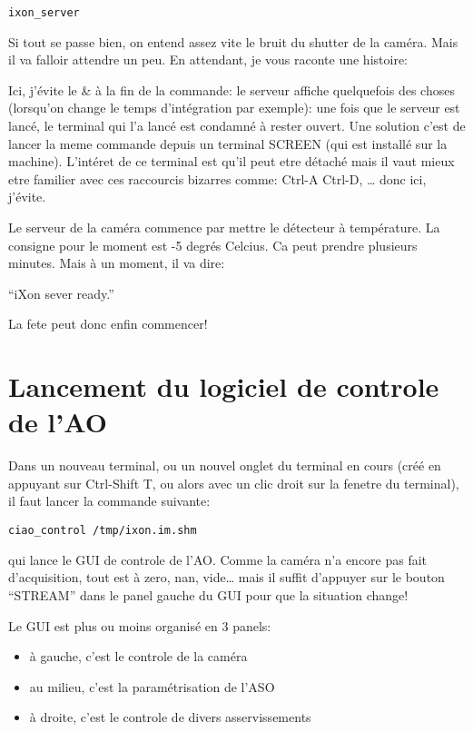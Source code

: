 \documentclass[11pt]{article}
\begin{document}
\begin{verbatim}
ixon_server
\end{verbatim}

Si tout se passe bien, on entend assez vite le bruit du shutter de la
caméra. Mais il va falloir attendre un peu. En attendant, je vous
raconte une histoire:

Ici, j'évite le \& à la fin de la commande: le serveur affiche
quelquefois des choses (lorsqu'on change le temps d'intégration par
exemple): une fois que le serveur est lancé, le terminal qui l'a
lancé est condamné à rester ouvert. Une solution c'est de lancer la
meme commande depuis un terminal SCREEN (qui est installé sur la
machine). L'intéret de ce terminal est qu'il peut etre détaché mais
il vaut mieux etre familier avec ces raccourcis bizarres comme: Ctrl-A
Ctrl-D, \ldots{} donc ici, j'évite.

Le serveur de la caméra commence par mettre le détecteur à
température. La consigne pour le moment est -5 degrés Celcius. Ca
peut prendre plusieurs minutes. Mais à un moment, il va dire:

``iXon sever ready.''

La fete peut donc enfin commencer!
\section{Lancement du logiciel de controle de l'AO}
\label{sec-3}


Dans un nouveau terminal, ou un nouvel onglet du terminal en cours
(créé en appuyant sur Ctrl-Shift T, ou alors avec un clic droit sur la
fenetre du terminal), il faut lancer la commande suivante:


\begin{verbatim}
ciao_control /tmp/ixon.im.shm
\end{verbatim}

qui lance le GUI de controle de l'AO. Comme la caméra n'a encore pas
fait d'acquisition, tout est à zero, nan, vide\ldots{} mais il suffit
d'appuyer sur le bouton ``STREAM'' dans le panel gauche du GUI pour que
la situation change!

Le GUI est plus ou moins organisé en 3 panels:

\begin{itemize}
\item à gauche, c'est le controle de la caméra
\item au milieu, c'est la paramétrisation de l'ASO
\item à droite, c'est le controle de divers asservissements
\end{itemize}
\end{document}
